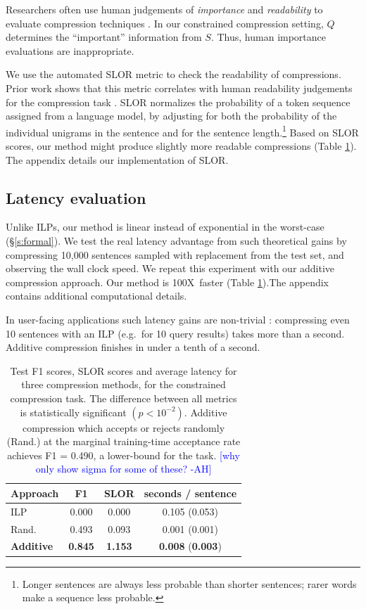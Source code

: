 \documentclass[11pt,a4paper]{article}
\newcommand{\speedup}[0]{100X~}
\newcommand{\ahcomment}[1]{\textcolor{blue}{[#1 -AH]}}
\begin{document}
Researchers often use human judgements of \textit{importance} and \textit{readability} to evaluate compression techniques \cite{Knight2000StatisticsBasedS,clarke2008global,filippova2015sentence}. In our constrained compression setting, $Q$ determines the ``important'' information from $S$. Thus, human importance evaluations are inappropriate.

We use the automated SLOR metric \cite{lau2015unsupervised} to check the readability of compressions. Prior work shows that this metric correlates with human readability judgements for the compression task \cite{kannConl}. SLOR normalizes the probability of a token sequence assigned from a language model, by adjusting for both the probability of the individual unigrams in the sentence and for the sentence length.\footnote{Longer sentences are always less probable than shorter sentences; rarer words make a sequence less probable.} Based on SLOR scores, our method might produce slightly more readable compressions (Table \ref{t:results}). The appendix details our implementation of SLOR. 

\subsection{Latency evaluation}\label{s:costs}

Unlike ILPs, our method is linear instead of exponential in the worst-case (\S\ref{s:formal}). We test the real latency advantage from such theoretical gains by compressing 10,000 sentences sampled with replacement from the test set, and observing the wall clock speed. We repeat this experiment with our additive compression approach. Our method is \speedup faster (Table \ref{t:results}).The appendix contains additional computational details.

In user-facing applications such latency gains are non-trivial \cite{Nielsen,heerschei,Liu2014TheEO}: compressing even 10 sentences with an ILP (e.g.\ for 10 query results) takes more than a second. Additive compression finishes in under a tenth of a second. 

\begin{table}[]
\begin{tabular}{lccc}
\centering
Approach & F1 & SLOR &  seconds / sentence  \\ \hline
ILP&{\small 0.000}&{\small 0.000}&{\small 0.105} ({\small 0.053})\\
Rand.&{\small 0.493}&{\small 0.093}&{\small 0.001} ({\small 0.001})\\
\textbf{Additive}&\textbf{\small 0.845}&\textbf{\small 1.153}&\textbf{\small 0.008} (\textbf{\small 0.003})\\\end{tabular}
\caption{Test F1 scores, SLOR scores and average latency for three compression methods, for the constrained compression task. The difference between all metrics is statistically significant {\small $(p < 10^{-2})$}. Additive compression which accepts or rejects randomly (Rand.) at the marginal training-time acceptance rate achieves F1 = 0.490, a lower-bound for the task. \ahcomment{why only show sigma for some of these?}}
\label{t:results}
\end{table}
\end{document}
